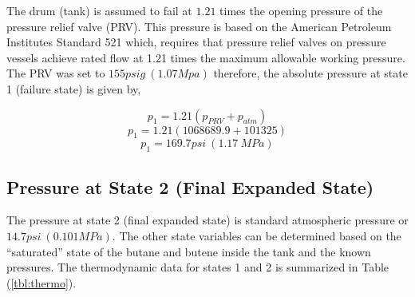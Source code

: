 \documentclass[10pt,parskip=half,
toc=sectionentrywithdots,
bibliography=totocnumbered,
captions=tableheading,numbers=noendperiod]{scrartcl}
\begin{document}
The drum (tank) is assumed to fail at \(1.21\) times the opening
pressure of the pressure relief valve (PRV)\cite{Engineers2013}. This
pressure is based on the American Petroleum Institutes Standard 521
which, requires that pressure relief valves on pressure vessels achieve
rated flow at 1.21 times the maximum allowable working pressure. The PRV
was set to \(155psig\:(1.07Mpa)\) therefore, the absolute pressure at
state 1 (failure state) is given by,

\begin{equation}p_1 = 1.21\left(p_{PRV}+p_{atm}\right)\end{equation}
\begin{equation}p_1 = 1.21\left(1068689.9+101325\right)\end{equation}
\begin{equation}p_1 = 169.7psi\:(1.17\:MPa)\end{equation}

\hypertarget{pressure-at-state-2-final-expanded-state}{%
\subsection{Pressure at State 2 (Final Expanded
State)}\label{pressure-at-state-2-final-expanded-state}}

The pressure at state 2 (final expanded state) is standard atmospheric
pressure or \(14.7psi\:(0.101MPa)\). The other state variables can be
determined based on the ``saturated'' state of the butane and butene
inside the tank and the known pressures. The thermodynamic data for
states 1 and 2 is summarized in Table (\cref{tbl:thermo}).
\end{document}
